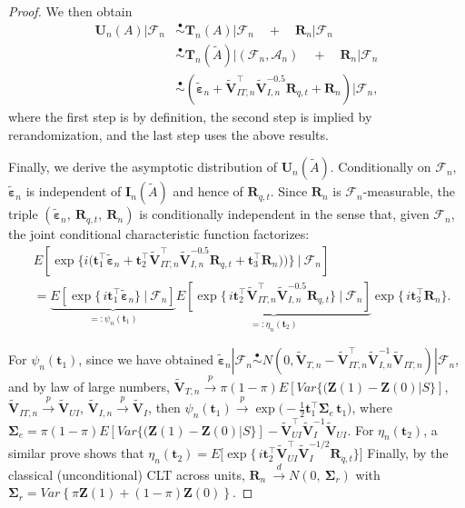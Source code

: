 \documentclass[12pt]{article}
\newcommand{\bI}{\boldsymbol{I}}
\newcommand{\bZ}{\boldsymbol{Z}}
\newcommand{\bU}{\boldsymbol{U}}
\newcommand{\bR}{\boldsymbol{R}}
\newcommand{\bT}{\boldsymbol{T}}
\newcommand{\bt}{\boldsymbol{t}}
\newcommand{\bSigma}{\mathbf{\Sigma}}
\newcommand{\bvarepsilon}{\boldsymbol{\varepsilon}}
\newcommand{\bfV}{\mathbf{V}}
\newcommand{\tbfV}{\widetilde{\bfV}}
\newcommand{\tbepsilon}{\widetilde{\bvarepsilon}}
\newcommand{\tA}{\widetilde{A}}
\begin{document}
\begin{proof}
We then obtain
\begin{align*}
    \bU_n(A) |\mathcal{F}_n  &\overset{\bullet}{\sim} \bT_n(A) | \mathcal{F}_n\quad  + \quad  \bR_n  | \mathcal{F}_n \\
    &\overset{\bullet}{\sim} \bT_n(\tA)| (\mathcal{F}_n, \mathcal{A}_n) \quad + \quad \bR_n  | \mathcal{F}_n \\
    &\overset{\bullet}{\sim} (\tbepsilon_n +  \tbfV_{IT,n}^\top   \tbfV_{I,n}^{-0.5} \bR_{q,t} + \bR_n)  | \mathcal{F}_n,
\end{align*}
where the first step is by definition, the second step is implied by rerandomization, and the last step uses the above results. 

Finally, we derive the asymptotic distribution of $\bU_n(\tA)$.
Conditionally on $\mathcal F_n$, $\tbepsilon_n$ is independent of $\bI_n(\tA)$ and hence of
$\bR_{q,t}$. Since $\bR_n$ is $\mathcal F_n$-measurable, the triple
$(\tbepsilon_n,\ \bR_{q,t},\ \bR_n)$ is conditionally independent in the sense that, given $\mathcal F_n$,
the joint conditional characteristic function factorizes:
\begin{align*}
& E\!\left[\exp\!\Big\{i\big(\bt_1^\top \tbepsilon_n
+ \bt_2^\top \tbfV_{IT,n}^\top   \tbfV_{I,n}^{-0.5} \bR_{q,t}  + \bt_3^\top \bR_n)\big)\Big\}\ \Big|\ \mathcal F_n\right]\\
&=
\underbrace{E\!\left[\exp\{\,i \bt_1^\top \tbepsilon_n\}\ \Big|\ \mathcal F_n\right]}_{=: \psi_{n}(\bt_1)}
\underbrace{E\!\left[\exp\{\,i \bt_2^\top  \tbfV_{IT,n}^\top   \tbfV_{I,n}^{-0.5} \bR_{q,t}\}\ \Big|\ \mathcal F_n\right]}_{=: \eta_{n}(\bt_2)}
 \exp\{\,i \bt_3^\top \bR_n\}.    
\end{align*}

For $\psi_{n}(\bt_1)$, since we have obtained $\tbepsilon_n | \mathcal{F}_n \overset{\bullet}{\sim} N(0, \tbfV_{T,n} - \tbfV_{IT,n}^\top \tbfV_{I,n}^{-1}\tbfV_{IT,n}) | \mathcal{F}_n$, and by law of large numbers, $\tbfV_{T,n} \xrightarrow{p} \pi(1-\pi)E[Var\{(\bZ(1)-\bZ(0)|S\}]$, $\tbfV_{IT,n} \xrightarrow{p} \tbfV_{UI}$, $\tbfV_{I,n} \xrightarrow{p} \tbfV_I$, then $\psi_{n}(\bt_1) \xrightarrow{p} \exp\!\Big(-\tfrac12 \bt_1^\top \bSigma_e\, \bt_1\Big)$, where  $\bSigma_e = \pi(1-\pi)E[Var\{(\bZ(1)-\bZ(0)|S\}] - \tbfV_{UI}^\top \tbfV_I^{-1} \tbfV_{UI}$.
For $\eta_n(\bt_2)$, a similar prove shows that $\eta_n(\bt_2) = E\!\big[\exp\{\,i \bt_2^\top \tbfV_{UI}^\top \tbfV_I^{-1/2} \bR_{q,t}\}\big]$
Finally, by the classical (unconditional) CLT across units,
$\bR_n\ \xrightarrow{d}  N(0,\ \bSigma_r)$ with $\bSigma_r = Var\left\{\pi \bZ(1) + (1-\pi) \bZ(0)\right\}$.


\end{proof}
\end{document}
